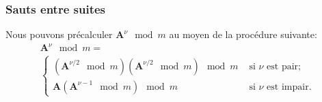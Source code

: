 \documentclass[t,usepdftitle=false]{beamer}
\def\bA{\boldsymbol{A}}
\begin{document}
\begin{frame}
\frametitle{Sauts entre suites}

Nous pouvons précalculer $\bA^\nu \mod m$ au moyen de la procédure suivante:
\begin{multline*}
  \bA^\nu \mod m = \\ \begin{cases}
    (\bA^{\nu/2} \mod m) (\bA^{\nu/2} \mod m) \mod m
                           & \mbox{ si $\nu$ est pair;} \\
    \bA (\bA^{\nu-1} \mod m) \mod m
                           & \mbox{ si $\nu$ est impair.}
 \end{cases}
\end{multline*}

\end{frame}
\end{document}
